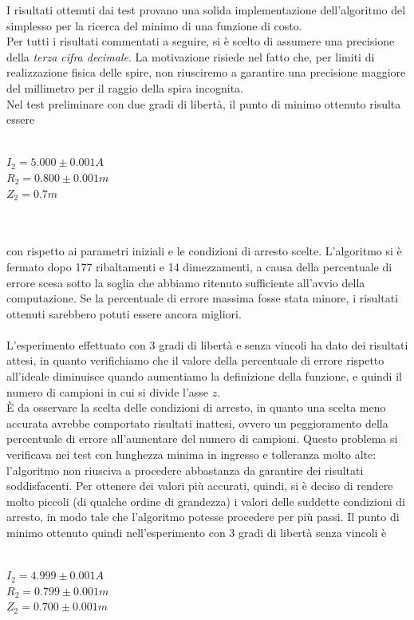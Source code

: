 \documentclass[a4paper, 11pt]{article}
\begin{document}
I risultati ottenuti dai test provano una solida implementazione dell'algoritmo
del simplesso per la ricerca del minimo di una funzione di costo. \\
Per tutti i risultati commentati a seguire, si è scelto di assumere una
precisione della \emph{terza cifra decimale}. La motivazione risiede nel fatto
che, per limiti di realizzazione fisica delle spire, non riusciremo a garantire
una precisione maggiore del millimetro per il raggio della spira incognita. \\ 
Nel test preliminare con due gradi di libertà, il punto di minimo ottenuto
risulta essere \\ \\
\centerline{ $I_{2} = 5.000 \pm 0.001 A$ \\ $R_{2} = 0.800 \pm 0.001m$ \\ $Z_{2}
= 0.7m$} \\ \\
con rispetto ai parametri iniziali e le condizioni di arresto scelte.
L'algoritmo si è fermato dopo 177 ribaltamenti e 14 dimezzamenti, a causa della
percentuale di errore scesa sotto la soglia che abbiamo ritenuto sufficiente
all'avvio della computazione. Se la percentuale di errore massima fosse stata
minore, i risultati ottenuti sarebbero potuti essere ancora migliori. \\
\\
L'esperimento effettuato con 3 gradi di libertà e senza vincoli ha dato dei
risultati attesi, in quanto verifichiamo che il valore della percentuale di
errore rispetto all'ideale diminuisce quando aumentiamo la definizione della
funzione, e quindi il numero di campioni in cui si divide l'asse $z$. \\ 
È da osservare la scelta delle condizioni di arresto, in quanto una scelta meno
accurata avrebbe comportato risultati inattesi, ovvero un peggioramento della
percentuale di errore all'aumentare del numero di campioni. Questo problema si
verificava nei test con lunghezza minima in ingresso e tolleranza molto alte:
l'algoritmo non riusciva a procedere abbastanza da garantire dei risultati
soddisfacenti. Per ottenere dei valori più accurati, quindi, si è deciso di
rendere molto piccoli (di qualche ordine di grandezza) i valori delle suddette
condizioni di arresto, in modo tale che l'algoritmo potesse procedere per più
passi. Il punto di minimo ottenuto quindi nell'esperimento con 3 gradi di
libertà senza vincoli è \\ \\
\centerline{ $I_{2} = 4.999 \pm 0.001 A$ \\ $R_{2} = 0.799 \pm 0.001m$ \\ $Z_{2}
= 0.700 \pm 0.001m$} \\ \\
\end{document}
